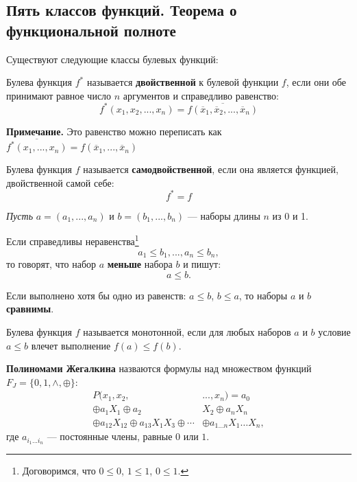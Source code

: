 \documentclass[14pt, a4paper]{extarticle}
\begin{document}
\subsection{Пять классов функций. Теорема о функциональной полноте}
Существуют следующие классы булевых функций:
\begin{itemize}
  \begin{defin}
  Булева функция $f^*$ называется \textbf{двойственной} к булевой функции $f$, если они обе принимают равное число $n$ аргументов и справедливо равенство:
  $$f^*(x_1, x_2, ..., x_n) = \overline{f(\overline x_1, \overline x_2, ..., \overline x_n)}$$
  \end{defin}

  {\small \textbf{Примечание.} Это равенство можно переписать как \newline
  $\overline{f^*(x_1, ..., x_n)} = f(\overline x_1, ..., \overline x_n)$}
  
  \begin{defin}
    Булева функция $f$ называется \textbf{самодвойственной}, если она является функцией, двойственной самой себе:
    $$ f^* = f $$
  \end{defin}

  \textit{Пусть} $ a = (a_1, ..., a_n) $ и $ b = (b_1, ..., b_n) $ --- наборы длины $n$ из 0 и 1.
  \begin{defin}
    Если справедливы неравенства\footnote{Договоримся, что $0 \le 0$, $1 \le 1$, $0 \le 1$.} $$a_1 \le b_1, ..., a_n \le b_n,$$
    то говорят, что набор $a$ \textbf{меньше} набора $b$ и пишут: $$ a \le b. $$
  \end{defin}
  \begin{defin}
  Если выполнено хотя бы одно из равенств: $a \le b$, $b \le a$, то наборы $a$ и $b$ \textbf{сравнимы}.
  \end{defin}
  \begin{defin}
    Булева функция $f$ называется монотонной, если для любых наборов $a$ и $b$ условие $a \le b$ влечет выполнение $f(a) \le f(b)$.
  \end{defin}

  \begin{defin}
    \textbf{Полиномами Жегалкина} назваются формулы над множеством функций $F_J= \{0, 1, \land, \oplus\}$:
    \begin{align}
    P(x_1, x_2, &..., x_n) = a_0 \\
    \oplus a_1X_1 \oplus a_2&X_2 \oplus a_nX_n \\
    \oplus a_{12}X_{12} \oplus a_{13}X_1X_3 \oplus \cdots& \oplus a_{1\dots n}X_1 \dots X_n,
    \end{align}
    где $a_{i_1...i_n}$ --- постоянные члены, равные $0$ или $1$.
  \end{defin}


\end{itemize}
\end{document}
